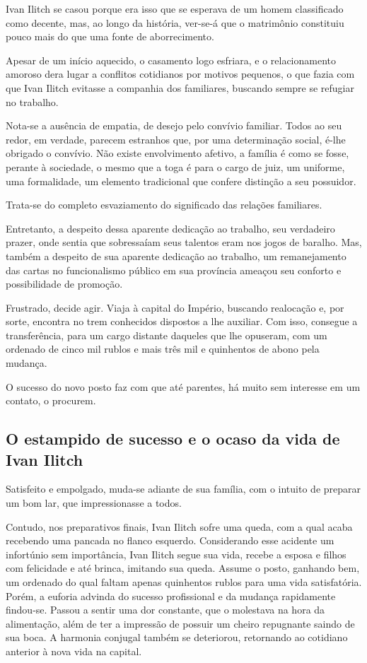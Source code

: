 \documentclass{extarticle}
\begin{document}
Ivan Ilitch se casou porque era isso que se esperava de um homem
classificado como decente, mas, ao longo da história, ver-se-á que o
matrimônio constituiu pouco mais do que uma fonte de aborrecimento.

Apesar de um início aquecido, o casamento logo esfriara, e o
relacionamento amoroso dera lugar a conflitos cotidianos por motivos
pequenos, o que fazia com que Ivan Ilitch evitasse a companhia dos
familiares, buscando sempre se refugiar no trabalho.

Nota-se a ausência de empatia, de desejo pelo convívio familiar. Todos
ao seu redor, em verdade, parecem estranhos que, por uma determinação
social, é-lhe obrigado o convívio. Não existe envolvimento afetivo, a
família é como se fosse, perante à sociedade, o mesmo que a toga é para
o cargo de juiz, um uniforme, uma formalidade, um elemento tradicional
que confere distinção a seu possuidor.

Trata-se do completo esvaziamento do significado das relações
familiares.

Entretanto, a despeito dessa aparente dedicação ao trabalho, seu
verdadeiro prazer, onde sentia que sobressaíam seus talentos eram nos
jogos de baralho. Mas, também a despeito de sua aparente dedicação ao
trabalho, um remanejamento das cartas no funcionalismo público em sua
província ameaçou seu conforto e possibilidade de promoção.

Frustrado, decide agir. Viaja à capital do Império, buscando realocação
e, por sorte, encontra no trem conhecidos dispostos a lhe auxiliar. Com
isso, consegue a transferência, para um cargo distante daqueles que lhe
opuseram, com um ordenado de cinco mil rublos e mais três mil e
quinhentos de abono pela mudança.

O sucesso do novo posto faz com que até parentes, há muito sem interesse
em um contato, o procurem.

\subsection{O estampido de sucesso e o ocaso da vida de Ivan Ilitch}

Satisfeito e empolgado, muda-se adiante de sua família, com o intuito de
preparar um bom lar, que impressionasse a todos.

Contudo, nos preparativos finais, Ivan Ilitch sofre uma queda, com a
qual acaba recebendo uma pancada no flanco esquerdo. Considerando esse
acidente um infortúnio sem importância, Ivan Ilitch segue sua vida,
recebe a esposa e filhos com felicidade e até brinca, imitando sua
queda. Assume o posto, ganhando bem, um ordenado do qual faltam apenas
quinhentos rublos para uma vida satisfatória. Porém, a euforia advinda
do sucesso profissional e da mudança rapidamente findou-se. Passou a
sentir uma dor constante, que o molestava na hora da alimentação, além
de ter a impressão de possuir um cheiro repugnante saindo de sua boca. A
harmonia conjugal também se deteriorou, retornando ao cotidiano anterior
à nova vida na capital.
\end{document}
